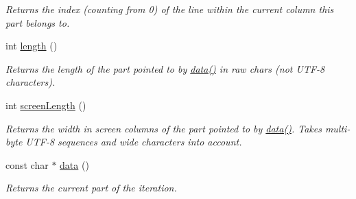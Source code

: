 \begin{DoxyCompactItemize}
\begin{DoxyCompactList}\small\item\em Returns the index (counting from 0) of the line within the current column this part belongs to. \end{DoxyCompactList}\item 
int \hyperlink{classoption_1_1PrintUsageImplementation_1_1LinePartIterator_a557e521cb41e951a34df2737d25f9dce}{length} ()\hypertarget{classoption_1_1PrintUsageImplementation_1_1LinePartIterator_a557e521cb41e951a34df2737d25f9dce}{}\label{classoption_1_1PrintUsageImplementation_1_1LinePartIterator_a557e521cb41e951a34df2737d25f9dce}

\begin{DoxyCompactList}\small\item\em Returns the length of the part pointed to by \hyperlink{classoption_1_1PrintUsageImplementation_1_1LinePartIterator_ada26229add63bd479c7877f2f8e32908}{data()} in raw chars (not U\+T\+F-\/8 characters). \end{DoxyCompactList}\item 
int \hyperlink{classoption_1_1PrintUsageImplementation_1_1LinePartIterator_a03b6fedfe805d7fc73216da5cd33270e}{screen\+Length} ()\hypertarget{classoption_1_1PrintUsageImplementation_1_1LinePartIterator_a03b6fedfe805d7fc73216da5cd33270e}{}\label{classoption_1_1PrintUsageImplementation_1_1LinePartIterator_a03b6fedfe805d7fc73216da5cd33270e}

\begin{DoxyCompactList}\small\item\em Returns the width in screen columns of the part pointed to by \hyperlink{classoption_1_1PrintUsageImplementation_1_1LinePartIterator_ada26229add63bd479c7877f2f8e32908}{data()}. Takes multi-\/byte U\+T\+F-\/8 sequences and wide characters into account. \end{DoxyCompactList}\item 
const char $\ast$ \hyperlink{classoption_1_1PrintUsageImplementation_1_1LinePartIterator_ada26229add63bd479c7877f2f8e32908}{data} ()\hypertarget{classoption_1_1PrintUsageImplementation_1_1LinePartIterator_ada26229add63bd479c7877f2f8e32908}{}\label{classoption_1_1PrintUsageImplementation_1_1LinePartIterator_ada26229add63bd479c7877f2f8e32908}

\begin{DoxyCompactList}\small\item\em Returns the current part of the iteration. \end{DoxyCompactList}\end{DoxyCompactItemize}


